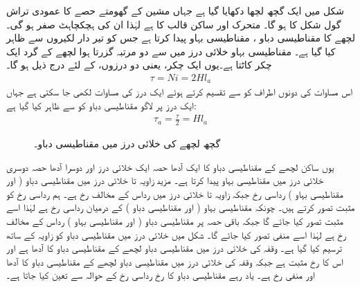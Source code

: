 شکل   میں ایک  گچھ لچھا  دکھایا گیا ہے جہاں مشین کے گھومتے حصے کا عمودی تراش گول شکل کا  ہو گا۔ متحرک اور ساکن  قالب  کا  ہے لہٰذا ان کی ہچکچاہٹ صفر ہو گی۔لچھے کا مقناطیسی دباو ،  مقناطیسی بہاو  پیدا کرتا  ہے جس کو تیر دار  لکیروں سے ظاہر کیا گیا ہے۔ مقناطیسی بہاو خلائی درز میں سے دو مرتبہ گزرتا ہوا لچھے کے گرد ایک چکر کاٹتا ہے۔یوں  ایک چکر، یعنی دو درزوں،  کے لئے درج ذیل ہو گا۔
\begin{align}
\tau=N i=2 H l_a
\end{align}
اس مساوات کی دونوں اطراف کو  سے تقسیم کرتے ہوئے  ایک درز کی مساوات لکھی جا سکتی ہے جہاں ایک درز پر لاگو مقناطیسی دباو کو   سے ظاہر کیا گیا ہے:
\begin{align*}
\tau_a=\frac{\tau}{2}=H l_a
\end{align*}
%
\begin{figure}
\centering
\caption{گچھ لچھے کی خلائی درز میں مقناطیسی دباو۔}
\label{شکل_گھومتے_مشین_گچھ_لچھے_کا_دباو}
\end{figure}%

یوں ساکن لچھے کے مقناطیسی دباو  کا  ایک آدھا حصہ  ایک خلائی درز اور دوسرا آدھا حصہ  دوسری خلائی درز میں مقناطیسی بہاو پیدا کرتا ہے۔ مزید  زاویہ  تا   خلائی درز میں مقناطیسی دباو ( اور  مقناطیسی بہاو )  رداسی رخ  جبکہ زاویہ  تا   خلائی درز میں  رداس کے مخالف رخ ہے۔ ہم رداسی رخ  کو مثبت تصور کرتے ہیں۔ چونکہ مقناطیسی بہاو ( اور مقناطیسی دباو )  کے درمیان رداسی رخ ہے لہٰذا اسے مثبت تصور کیا جائے گا جبکہ باقی حصہ پر مقناطیسی دباو ( اور مقناطیسی بہاو ) رداس کے مخالف رخ ہے لہٰذا  اسے منفی تصور کیا جائے گا۔  شکل  میں خلائی درز میں مقناطیسی دباو کو زاویہ کے ساتھ ترسیم کیا گیا ہے۔ وقفہ  کی خلائی درز میں مقناطیسی دباو  لچھے کے مقناطیسی دباو  کا آدھا ہے اور اس کا رخ مثبت ہے جبکہ وقفہ  کی خلائی درز میں مقناطیسی دباو لچھے کے مقناطیسی دباو کا آدھا  اور منفی رخ  ہے۔ یاد رہے مقناطیسی دباو کا رخ  رداسی رخ کے حوالہ  سے تعین کیا جاتا ہے۔

